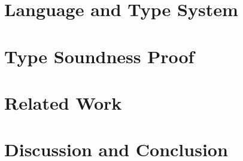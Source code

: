 \documentclass[preprint]{sigplanconf}
\begin{document}
\section{\label{section-lang}Language and Type System}

\section{\label{section-proof}Type Soundness Proof}

\section{\label{section-related}Related Work}

\section{\label{section-discussion}Discussion and Conclusion}

\appendix











\end{document}
